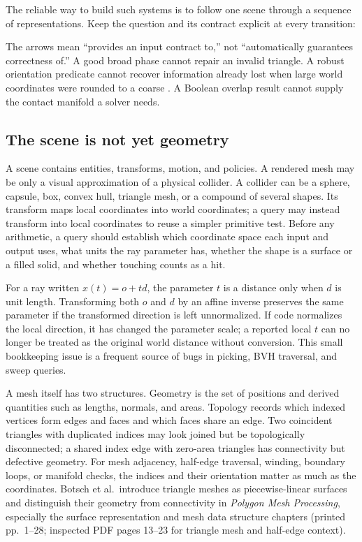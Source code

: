 The reliable way to build such systems is to follow one scene through a sequence of representations. Keep the question and its contract explicit at every transition:


The arrows mean ``provides an input contract to,'' not ``automatically guarantees correctness of.'' A good broad phase cannot repair an invalid triangle. A robust orientation predicate cannot recover information already lost when large world coordinates were rounded to a coarse . A Boolean overlap result cannot supply the contact manifold a solver needs.

\subsection{The scene is not yet geometry}\label{03-visual-computing-i-ch020-the-scene-is-not-yet-geometry}

\hypertarget{03-visual-computing-i-ch020-the-scene-is-not-yet-geometry}{}

A scene contains entities, transforms, motion, and policies. A rendered mesh may be only a visual approximation of a physical collider. A collider can be a sphere, capsule, box, convex hull, triangle mesh, or a compound of several shapes. Its transform maps local coordinates into world coordinates; a query may instead transform into local coordinates to reuse a simpler primitive test. Before any arithmetic, a query should establish which coordinate space each input and output uses, what units the ray parameter has, whether the shape is a surface or a filled solid, and whether touching counts as a hit.

For a ray written \(x(t)=o+td\), the parameter \(t\) is a distance only when \(d\) is unit length. Transforming both \(o\) and \(d\) by an affine inverse preserves the same parameter if the transformed direction is left unnormalized. If code normalizes the local direction, it has changed the parameter scale; a reported local \(t\) can no longer be treated as the original world distance without conversion. This small bookkeeping issue is a frequent source of bugs in picking, BVH traversal, and sweep queries.

A mesh itself has two structures. Geometry is the set of positions and derived quantities such as lengths, normals, and areas. Topology records which indexed vertices form edges and faces and which faces share an edge. Two coincident triangles with duplicated indices may look joined but be topologically disconnected; a shared index edge with zero-area triangles has connectivity but defective geometry. For mesh adjacency, half-edge traversal, winding, boundary loops, or manifold checks, the indices and their orientation matter as much as the coordinates. Botsch et al.~introduce triangle meshes as piecewise-linear surfaces and distinguish their geometry from connectivity in \emph{Polygon Mesh Processing}, especially the surface representation and mesh data structure chapters (printed pp.~1--28; inspected PDF pages 13--23 for triangle mesh and half-edge context).

